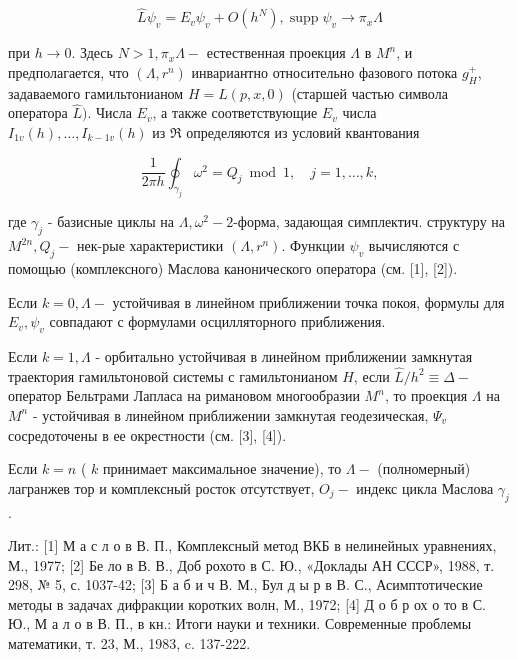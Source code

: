\documentclass[10pt]{article}
\begin{document}
\[

\hat{L} \psi_{v}=E_{v} \psi_{v}+O\left(h^{N}\right), \operatorname{supp} \psi_{v} \rightarrow \pi_{x} \Lambda

\]



при $h \rightarrow 0$. Здесь $N>1, \pi_{x} \Lambda-$ естественная проекция $\Lambda$ в $M^{n}$, и предполагается, что $\left(\Lambda, r^{n}\right)$ инвариантно относительно фазового потока $g_{H}^{+}$, задаваемого гамильтонианом $H=L(p, x, 0)$ (старшей частью символа оператора $\hat{L})$. Числа $E_{v}$, а также соответствующие $E_{v}$ числа $I_{1 v}(h), \ldots, I_{k-1 v}(h)$ из $\mathfrak{R}$ определяются из условий квантования



\[

\frac{1}{2 \pi h} \oint_{\gamma_{j}} \omega^{2}=Q_{j} \bmod 1, \quad j=1, \ldots, k,

\]



где $\gamma_{j}$ - базисные циклы на $\Lambda, \omega^{2}-2$-форма, задающая симплектич. структуру на $M^{2 n}, Q_{j}-$ нек-рые характеристики $\left(\Lambda, r^{n}\right)$. Функции $\psi_{v}$ вычисляются с помощью (комплексного) Маслова канонического оператора (см. [1], [2]).



Если $k=0, \Lambda-$ устойчивая в линейном приближении точка покоя, формулы для $E_{v}, \psi_{v}$ совпадают с формулами осцилляторного приближения.



Если $k=1, \Lambda$ - орбитально устойчивая в линейном приближении замкнутая траектория гамильтоновой системы с гамильтонианом $H$, если $\hat{L} / h^{2} \equiv \Delta-$ оператор Бельтрами Лапласа на римановом многообразии $M^{n}$, то проекция $\Lambda$ на $M^{n}$ - устойчивая в линейном приближении замкнутая геодезическая, $\Psi_{v}$ сосредоточены в ее окрестности (см. [3], [4]).



Если $k=n$ ( $k$ принимает максимальное значение), то $\Lambda-$ (полномерный) лагранжев тор и комплексный росток отсутствует, $O_{j}-$ индекс цикла Маслова $\gamma_{j}$.



Лит.: [1] М а с л о в В. П., Комплексный метод ВКБ в нелинейных уравнениях, М., 1977; [2] Бе ло в В. В., Доб рохото в С. Ю., «Доклады АН СССР», 1988, т. 298, № 5, с. 1037-42; [3] Б а б и ч В. М., Бул д ы р в В. С., Асимптотические методы в задачах дифракции коротких волн, М., 1972; [4] Д о б р ох о то в С. Ю., М а л о в В. П., в кн.: Итоги науки и техники. Современные проблемы математики, т. 23, М., 1983, c. 137-222.
\end{document}
